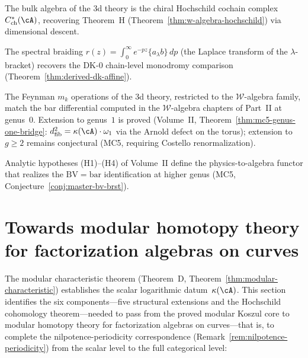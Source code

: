\begin{conjecture}
\label{conj:vol2-hochschild-bridge}
The bulk algebra of the 3d theory is the chiral Hochschild cochain
complex $C^*_{\mathrm{ch}}(\cA)$, recovering Theorem~H
(Theorem~\ref{thm:w-algebra-hochschild}) via dimensional
descent.
\end{conjecture}

\begin{proposition}
\label{conj:vol2-dk-ybe-bridge}
The spectral braiding $r(z) = \int_0^\infty e^{-pz}
\{a_\lambda b\}\,dp$ (the Laplace transform of the
$\lambda$-bracket) recovers the DK-0 chain-level
monodromy comparison (Theorem~\ref{thm:derived-dk-affine}).
\end{proposition}

\begin{proposition}
\label{conj:vol2-w-algebra-bridge}
The Feynman $m_k$ operations of the 3d theory, restricted to
the $\mathcal{W}$-algebra family, match the bar differential computed in the
$\mathcal{W}$-algebra chapters of Part~II at genus~$0$.
Extension to genus~$1$ is proved
(Volume~II, Theorem~\ref{thm:mc5-genus-one-bridge}:
$d_{\mathrm{fib}}^2 = \kappa(\cA)\cdot\omega_1$ via the Arnold
defect on the torus); extension to $g \geq 2$ remains conjectural
(MC5, requiring Costello renormalization).
\end{proposition}

\begin{conjecture}
\label{conj:vol2-bv-functor-bridge}
Analytic hypotheses (H1)--(H4) of Volume~II define the
physics-to-algebra functor that realizes the
$\mathrm{BV} = \mathrm{bar}$ identification at higher
genus (MC5, Conjecture~\ref{conj:master-bv-brst}).
\end{conjecture}


\section[Towards modular homotopy theory]{Towards modular homotopy theory for factorization algebras on curves}
\label{sec:modular-koszul-programme}

The modular characteristic theorem (Theorem~D,
Theorem~\ref{thm:modular-characteristic}) establishes the scalar
logarithmic datum~$\kappa(\cA)$.  This section identifies the six
components---five structural extensions and the Hochschild
cohomology theorem---needed to pass from the proved modular Koszul
core to modular homotopy theory for factorization algebras on
curves---that is, to complete the nilpotence-periodicity
correspondence
(Remark~\ref{rem:nilpotence-periodicity}) from the scalar level to
the full categorical level:

